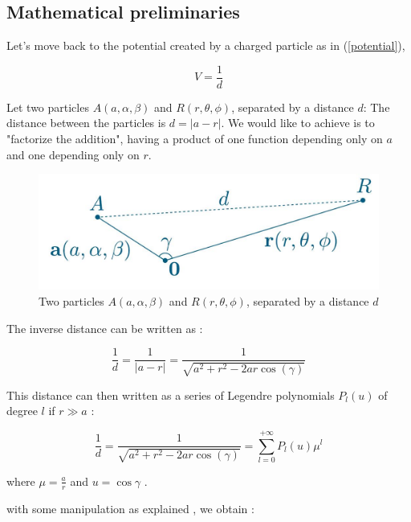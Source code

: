 \documentclass[11pt,twoside,a4paper]{report}
\begin{document}
	\subsection{Mathematical preliminaries}
	
	Let's move back to the potential created by a charged particle as in (\ref{potential}),
	
	\begin{equation*}
	V = \frac{1}{d}
	\end{equation*}
	
	Let two particles $A(a,\alpha,\beta)$ and $R(r,\theta,\phi)$, separated by a distance $d$: The distance between the particles is $d = |a - r|$.
	We would like to achieve is to "factorize the addition", having a product of one function depending only on $a$ and one depending only on $r$.
	
	
\begin{figure}[H]
\includegraphics[scale=0.4]{distance}
 \centering 
\caption{Two particles $A(a,\alpha,\beta)$ and $R(r,\theta,\phi)$, separated by a distance $d$}
\label{fig:poster}
\end{figure}	
	
	
	The inverse distance can be written as :
	
	\begin{equation*}
		\frac{1}{d} = \frac{1}{|a-r|} = \frac{1}{\sqrt{a^2 + r^2 - 2ar \cos(\gamma)}}
	\end{equation*}

	This distance can then written as a series of Legendre polynomials  $P_l(u)$ of degree $l$ if $r \gg a$ :
	
	\begin{equation}
		\frac{1}{d} = \frac{1}{\sqrt{a^2 + r^2 - 2ar \cos(\gamma)}} = \sum\limits_{l=0}^{+\infty} P_l(u)\mu^l
	\end{equation}
	
	
	where $\mu = \frac{a}{r}$ and $u = \cos{\gamma}$ .
	
	with some manipulation as explained \cite{phdIvo} , we obtain : 
	
\end{document}
